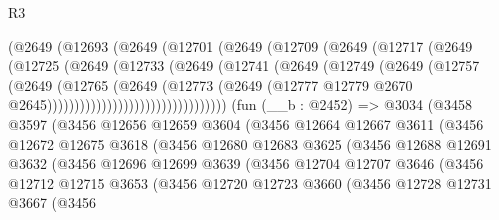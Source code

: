 \begin{lexlean}{R3}
\begin{coremodule}
                      (@2649
                        (@12693
                          (@2649
                            (@12701
                              (@2649
                                (@12709
                                  (@2649
                                    (@12717
                                      (@2649
                                        (@12725
                                          (@2649
                                            (@12733
                                              (@2649
                                                (@12741
                                                  (@2649
                                                    (@12749
                                                      (@2649
                                                        (@12757
                                                          (@2649
                                                            (@12765
                                                              (@2649
                                                                (@12773
                                                                  (@2649
                                                                    (@12777
                                                                      @12779
                                                                      @2670
                                                                      @2645)))))))))))))))))))))))))))))))))
    (fun (__b : @2452) =>
    @3034
      (@3458
        @3597
        (@3456
          @12656
          @12659
          @3604
          (@3456
            @12664
            @12667
            @3611
            (@3456
              @12672
              @12675
              @3618
              (@3456
                @12680
                @12683
                @3625
                (@3456
                  @12688
                  @12691
                  @3632
                  (@3456
                    @12696
                    @12699
                    @3639
                    (@3456
                      @12704
                      @12707
                      @3646
                      (@3456
                        @12712
                        @12715
                        @3653
                        (@3456
                          @12720
                          @12723
                          @3660
                          (@3456
                            @12728
                            @12731
                            @3667
                            (@3456

\end{coremodule}
\end{lexlean}
